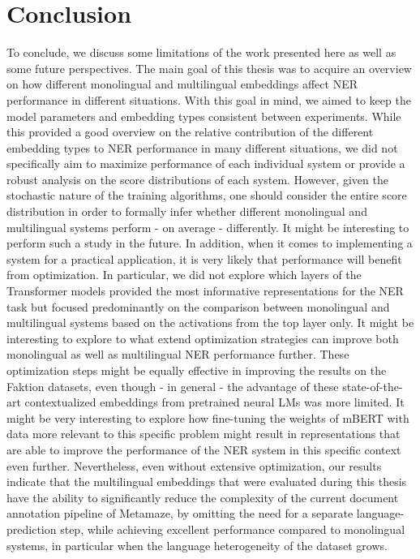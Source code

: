 \documentclass[12pt,a4paper,]{book}
\begin{document}
\hypertarget{conclusion}{%
\section{Conclusion}\label{conclusion}}

To conclude, we discuss some limitations of the work presented here as well as some future perspectives. The main goal of this thesis was to acquire an overview on how different monolingual and multilingual embeddings affect NER performance in different situations. With this goal in mind, we aimed to keep the model parameters and embedding types consistent between experiments. While this provided a good overview on the relative contribution of the different embedding types to NER performance in many different situations, we did not specifically aim to maximize performance of each individual system or provide a robust analysis on the score distributions of each system. However, given the stochastic nature of the training algorithms, one should consider the entire score distribution in order to formally infer whether different monolingual and multilingual systems perform - on average - differently. It might be interesting to perform such a study in the future. In addition, when it comes to implementing a system for a practical application, it is very likely that performance will benefit from optimization. In particular, we did not explore which layers of the Transformer models provided the most informative representations for the NER task but focused predominantly on the comparison between monolingual and multilingual systems based on the activations from the top layer only. It might be interesting to explore to what extend optimization strategies can improve both monolingual as well as multilingual NER performance further. These optimization steps might be equally effective in improving the results on the Faktion datasets, even though - in general - the advantage of these state-of-the-art contextualized embeddings from pretrained neural LMs was more limited. It might be very interesting to explore how fine-tuning the weights of mBERT with data more relevant to this specific problem might result in representations that are able to improve the performance of the NER system in this specific context even further. Nevertheless, even without extensive optimization, our results indicate that the multilingual embeddings that were evaluated during this thesis have the ability to significantly reduce the complexity of the current document annotation pipeline of Metamaze, by omitting the need for a separate language-prediction step, while achieving excellent performance compared to monolingual systems, in particular when the language heterogeneity of the dataset grows.
\end{document}
